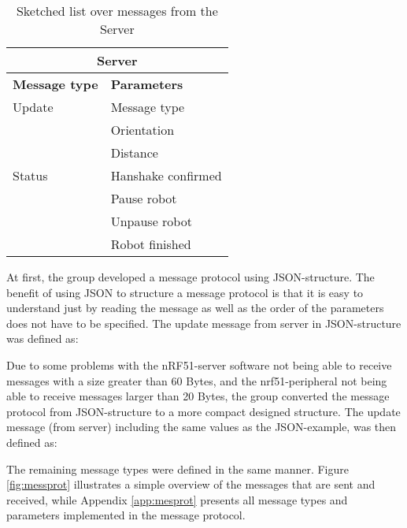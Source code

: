 \begin{table}[ht]
\begin{center}
 \begin{tabular}{|l | l|} 
 \hline
 \multicolumn{2}{|c|}{\textbf{Server}}\\
 \hline
 \hline
 \textbf{Message type}       &    \textbf{Parameters} \\
 \hline

 Update              &   Message type \\
                    &   Orientation \\
                    &   Distance \\
 \hline
 Status                &   Hanshake confirmed \\
                    &   Pause robot \\
                    &   Unpause robot \\
                    &   Robot finished \\
 \hline
\end{tabular}
\end{center}
\caption{Sketched list over messages from the Server}
\label{tab:messprotfromser}
\end{table}

At first, the group developed a message protocol using JSON-structure. The benefit of using JSON to structure a message protocol is that it is easy to understand just by reading the message as well as the order of the parameters does not have to be specified. The update message from server in JSON-structure was defined as:


Due to some problems with the nRF51-server software not being able to receive messages with a size greater than 60 Bytes, and the nrf51-peripheral not being able to receive messages larger than 20 Bytes, the group converted the message protocol from JSON-structure to a more compact designed structure. The update message (from server) including the same values as the JSON-example, was then defined as:


The remaining message types were defined in the same manner. Figure \ref{fig:messprot} illustrates a simple overview of the messages that are sent and received, while Appendix \ref{app:mesprot} presents all message types and parameters implemented in the message protocol.

